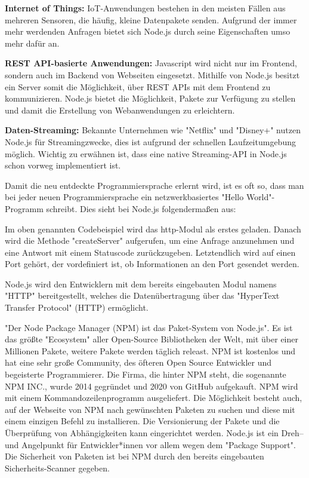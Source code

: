     \textbf{Internet of Things:}
    IoT-Anwendungen bestehen in den meisten Fällen aus mehreren Sensoren, die häufig, kleine Datenpakete senden. Aufgrund der immer mehr werdenden Anfragen bietet sich Node.js durch seine Eigenschaften umso mehr dafür an.

    \textbf{REST API-basierte Anwendungen:}
    Javascript wird nicht nur im Frontend, sondern auch im Backend von Webseiten eingesetzt. Mithilfe von Node.js besitzt ein Server somit die Möglichkeit, über REST APIs mit dem Frontend zu kommunizieren. Node.js bietet die Möglichkeit, Pakete zur Verfügung zu stellen und damit die Erstellung von Webanwendungen zu erleichtern. 

    \textbf{Daten-Streaming:}
    Bekannte Unternehmen wie "Netflix" und "Disney+" nutzen Node.js für Streamingzwecke, dies ist aufgrund der schnellen Laufzeitumgebung möglich. Wichtig zu erwähnen ist, dass eine native Streaming-API in Node.js schon vorweg implementiert ist.



Damit die neu entdeckte Programmiersprache erlernt wird, ist es oft so, dass man bei jeder neuen Programmiersprache ein netzwerkbasiertes "Hello World"-Programm schreibt. Dies sieht bei Node.js folgendermaßen aus:


Im oben genannten Codebeispiel wird das http-Modul als erstes geladen. Danach wird die Methode "createServer" aufgerufen, um eine Anfrage anzunehmen und eine Antwort mit einem Statuscode zurückzugeben. Letztendlich wird auf einen Port gehört, der vordefiniert ist, ob Informationen an den Port gesendet werden.

Node.js wird den Entwicklern mit dem bereits eingebauten Modul namens "HTTP" bereitgestellt, welches die Datenübertragung über das "HyperText Transfer Protocol" (HTTP) ermöglicht. \cite{HelloWorld}

\pagebreak
{}
\label{sec:npm}

"Der Node Package Manager (NPM) ist das Paket-System von Node.js". \cite{NPMIntro} Es ist das größte "Ecosystem" aller Open-Source Bibliotheken der Welt, mit über einer Millionen Pakete, weitere Pakete werden täglich releast. NPM ist kostenlos und hat eine sehr große Community, des öfteren Open Source Entwickler und begeisterte Programmierer. Die Firma, die hinter NPM steht, die sogenannte NPM INC., wurde 2014 gegründet und 2020 von GitHub aufgekauft.
NPM wird mit einem Kommandozeilenprogramm ausgeliefert. Die Möglichkeit besteht auch, auf der Webseite von NPM nach gewünschten Paketen zu suchen und diese mit einem einzigen Befehl zu installieren. Die Versionierung der Pakete und die Überprüfung von Abhängigkeiten kann eingerichtet werden. Node.js ist ein Dreh– und Angelpunkt für Entwickler*innen vor allem wegen dem "Package Support".
Die Sicherheit von Paketen ist bei NPM durch den bereits eingebauten Sicherheits-Scanner gegeben. \cite{NPM} \cite{NPM2} \cite{NPMIntro}


